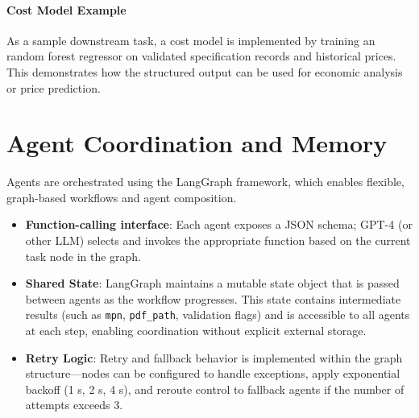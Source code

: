\paragraph{Cost Model Example}  
As a sample downstream task, a cost model is implemented by training an random forest regressor on validated specification records and historical prices. This demonstrates how the structured output can be used for economic analysis or price prediction.

\section{Agent Coordination and Memory}
Agents are orchestrated using the LangGraph framework, which enables flexible, graph-based workflows and agent composition.  
\begin{itemize}
  \item \textbf{Function-calling interface}: Each agent exposes a JSON schema; GPT-4 (or other LLM) selects and invokes the appropriate function based on the current task node in the graph.
  \item \textbf{Shared State}: LangGraph maintains a mutable state object that is passed between agents as the workflow progresses. This state contains intermediate results (such as \verb|mpn|, \verb|pdf_path|, validation flags) and is accessible to all agents at each step, enabling coordination without explicit external storage.
  \item \textbf{Retry Logic}: Retry and fallback behavior is implemented within the graph structure—nodes can be configured to handle exceptions, apply exponential backoff (1 s, 2 s, 4 s), and reroute control to fallback agents if the number of attempts exceeds 3.
\end{itemize}

